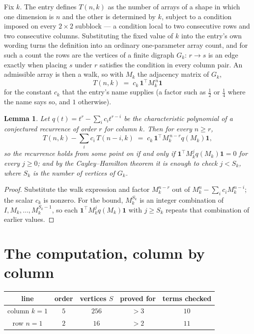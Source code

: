 \documentclass[11pt,a4paper]{article}
\theoremstyle{plain}
\newtheorem{lemma}[theorem]{Lemma}
\theoremstyle{definition}
\begin{document}
Fix $k$. The entry defines $T(n,k)$ as the number of arrays of a shape in which one dimension
is $n$ and the other is determined by $k$, subject to a condition imposed on every
$2\times2$ subblock --- a condition local to two consecutive rows and two consecutive columns.
Substituting the fixed value of $k$ into the entry's own wording turns the definition into an
ordinary one-parameter array count, and for such a count the rows are the vertices of a finite
digraph $G_k$: $r\to s$ is an edge exactly when placing $s$ under $r$ satisfies the condition
in every column pair. An admissible array is then a walk, so with $M_k$ the adjacency matrix
of $G_k$,
\[
T(n,k)\;=\;c_k\,\mathbf{1}^{\!\top}M_k^{\,n}\mathbf{1}
\]
for the constant $c_k$ that the entry's name supplies (a factor such as $\tfrac12$ or
$\tfrac14$ where the name says so, and $1$ otherwise).

\begin{lemma}\label{lem:crit}
Let $q(t)=t^{r}-\sum_i c_it^{r-i}$ be the characteristic polynomial of a conjectured
recurrence of order $r$ for column $k$. Then for every $n\ge r$,
\[
T(n,k)-\sum_i c_i\,T(n-i,k)\;=\;c_k\,\mathbf{1}^{\!\top}M_k^{\,n-r}q(M_k)\mathbf{1},
\]
so the recurrence holds from some point on if and only if
$\mathbf{1}^{\!\top}M_k^{j}q(M_k)\mathbf{1}=0$ for every $j\ge0$; and by the
Cayley--Hamilton theorem it is enough to check $j<S_k$, where $S_k$ is the number of vertices
of $G_k$.
\end{lemma}

\begin{proof}
Substitute the walk expression and factor $M_k^{n-r}$ out of $M_k^{n}-\sum_ic_iM_k^{n-i}$;
the scalar $c_k$ is nonzero. For the bound, $M_k^{S_k}$ is an integer combination of
$I,M_k,\dots,M_k^{S_k-1}$, so each $\mathbf{1}^{\!\top}M_k^{j}q(M_k)\mathbf{1}$ with
$j\ge S_k$ repeats that combination of earlier values.
\end{proof}

\section{The computation, column by column}

\begin{center}
\begin{tabular}{ccccc}
line & order & vertices $S$ & proved for & terms checked \\ \hline
column $k$$=1$ & $5$ & $256$ & $>3$ & $10$ \\
row $n$$=1$ & $2$ & $16$ & $>2$ & $11$ \\
\end{tabular}
\end{center}
\end{document}
